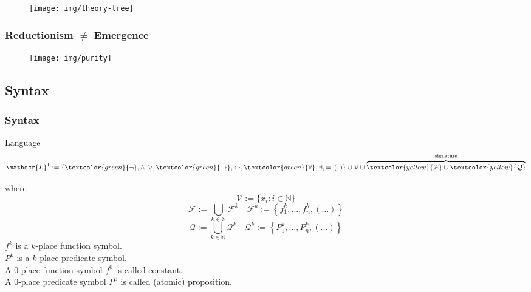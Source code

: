 \documentclass[UTF8,aspectratio=43,11pt,colorlinks,compress,openany]{beamer}%
\begin{document}
\begin{frame}\frametitle{}
	\begin{figure}
		\texttt{[image: img/theory-tree]}
	\end{figure}
\end{frame}

\begin{frame}\frametitle{Reductionism $\ne$ Emergence}
	\begin{figure}
		\texttt{[image: img/purity]}
	\end{figure}
\end{frame}

\subsection{Syntax}

\begin{frame}\frametitle{Syntax}
		\begin{block}{Language}
			\[\mathscr{L}^1:=\{\textcolor{green}{\neg},\wedge,\vee,\textcolor{green}{\to},\leftrightarrow,\textcolor{green}{\forall},\exists,=,(,)\}\cup\mathcal{V}\cup\overbrace{\textcolor{yellow}{\mathcal{F}}\cup\textcolor{yellow}{\mathcal{Q}}}^{\text{signature}}\]
		\end{block}
		where
		\[\mathcal{V}:=\{x_i: i\in\mathbb{N}\}\]
		\[\mathcal{F}:=\bigcup\limits_{k\in\mathbb{N}}\mathcal{F}^k\quad \mathcal{F}^k:=\left\{f_1^k,\dots,f_n^k,(\dots)\right\}\]
		\[\mathcal{Q}:=\bigcup\limits_{k\in\mathbb{N}}\mathcal{Q}^k\quad \mathcal{Q}^k:=\left\{P_1^k,\dots,P_n^k,(\dots)\right\}\]
		$f^k$ is a $k$-place function symbol.\\
		$P^k$ is a $k$-place predicate symbol.\\
		A $0$-place function symbol $f^0$ is called constant.\\
		A $0$-place predicate symbol $P^0$ is called (atomic) proposition.
\end{frame}
\end{document}
